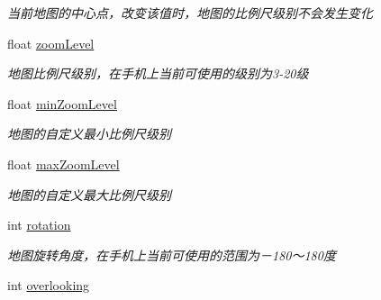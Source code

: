 \begin{DoxyCompactItemize}
\begin{DoxyCompactList}\small\item\em 当前地图的中心点，改变该值时，地图的比例尺级别不会发生变化 \end{DoxyCompactList}\item 
\hypertarget{interface_b_m_k_map_view_a5e6c1e21fddd4d6a24194be53f14c27e}{}float \hyperlink{interface_b_m_k_map_view_a5e6c1e21fddd4d6a24194be53f14c27e}{zoom\+Level}\label{interface_b_m_k_map_view_a5e6c1e21fddd4d6a24194be53f14c27e}

\begin{DoxyCompactList}\small\item\em 地图比例尺级别，在手机上当前可使用的级别为3-\/20级 \end{DoxyCompactList}\item 
\hypertarget{interface_b_m_k_map_view_ab504b39a0a908c811a258e058be7eeb9}{}float \hyperlink{interface_b_m_k_map_view_ab504b39a0a908c811a258e058be7eeb9}{min\+Zoom\+Level}\label{interface_b_m_k_map_view_ab504b39a0a908c811a258e058be7eeb9}

\begin{DoxyCompactList}\small\item\em 地图的自定义最小比例尺级别 \end{DoxyCompactList}\item 
\hypertarget{interface_b_m_k_map_view_ae9fce90bc3332cdf0dc477c3959e5e79}{}float \hyperlink{interface_b_m_k_map_view_ae9fce90bc3332cdf0dc477c3959e5e79}{max\+Zoom\+Level}\label{interface_b_m_k_map_view_ae9fce90bc3332cdf0dc477c3959e5e79}

\begin{DoxyCompactList}\small\item\em 地图的自定义最大比例尺级别 \end{DoxyCompactList}\item 
\hypertarget{interface_b_m_k_map_view_a344d3d4be5d00adfc22feaa2ab6869c4}{}int \hyperlink{interface_b_m_k_map_view_a344d3d4be5d00adfc22feaa2ab6869c4}{rotation}\label{interface_b_m_k_map_view_a344d3d4be5d00adfc22feaa2ab6869c4}

\begin{DoxyCompactList}\small\item\em 地图旋转角度，在手机上当前可使用的范围为－180～180度 \end{DoxyCompactList}\item 
\hypertarget{interface_b_m_k_map_view_a8ae6f6cf221ea4f14923150d8974f997}{}int \hyperlink{interface_b_m_k_map_view_a8ae6f6cf221ea4f14923150d8974f997}{overlooking}\label{interface_b_m_k_map_view_a8ae6f6cf221ea4f14923150d8974f997}


\end{DoxyCompactItemize}
